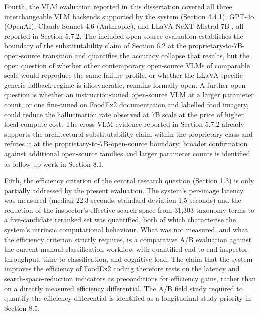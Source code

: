 Fourth, the VLM evaluation reported in this dissertation covered all three interchangeable VLM backends supported by the system (Section 4.4.1): GPT-4o (OpenAI), Claude Sonnet 4.6 (Anthropic), and LLaVA-NeXT-Mistral-7B \parencite{liu_llava_next_2024}, all reported in Section 5.7.2. The included open-source evaluation establishes the boundary of the substitutability claim of Section 6.2 at the proprietary-to-7B-open-source transition and quantifies the accuracy collapse that results, but the open question of whether other contemporary open-source VLMs of comparable scale would reproduce the same failure profile, or whether the LLaVA-specific generic-fallback regime is idiosyncratic, remains formally open. A further open question is whether an instruction-tuned open-source VLM at a larger parameter count, or one fine-tuned on FoodEx2 documentation and labelled food imagery, could reduce the hallucination rate observed at 7B scale at the price of higher local compute cost. The cross-VLM evidence reported in Section 5.7.2 already supports the architectural substitutability claim within the proprietary class and refutes it at the proprietary-to-7B-open-source boundary; broader confirmation against additional open-source families and larger parameter counts is identified as follow-up work in Section 8.1.

Fifth, the efficiency criterion of the central research question (Section 1.3) is only partially addressed by the present evaluation. The system's per-image latency was measured (median 22.3 seconds, standard deviation 1.5 seconds) and the reduction of the inspector's effective search space from 31,303 taxonomy terms to a five-candidate reranked set was quantified, both of which characterise the system's intrinsic computational behaviour. What was not measured, and what the efficiency criterion strictly requires, is a comparative A/B evaluation against the current manual classification workflow with quantified end-to-end inspector throughput, time-to-classification, and cognitive load. The claim that the system improves the efficiency of FoodEx2 coding therefore rests on the latency and search-space-reduction indicators as preconditions for efficiency gains, rather than on a directly measured efficiency differential. The A/B field study required to quantify the efficiency differential is identified as a longitudinal-study priority in Section 8.5.
